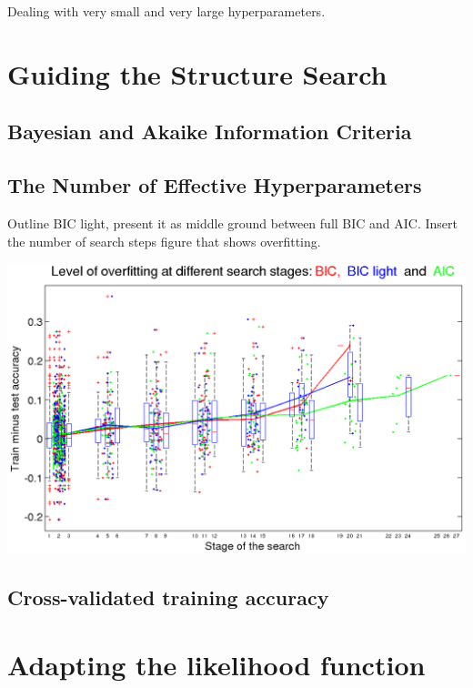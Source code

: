 \documentclass[a4paper,12pt ]{report}
\begin{document}
Dealing with very small and very large hyperparameters. 

\section{Guiding the Structure Search}

\subsection{Bayesian and Akaike Information Criteria}

\subsection{The Number of Effective Hyperparameters}

Outline BIC light, present it as middle ground between full BIC and AIC. 
Insert the number of search steps figure that shows overfitting. 


\includegraphics[scale=0.37]{figures/measureoverfit.png}

\subsection{Cross-validated training accuracy}




\section{Adapting the likelihood function}
\end{document}
